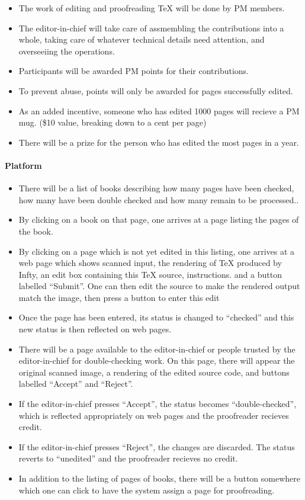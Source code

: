 \begin{itemize}
\begin{itemize}
\item
  The work of editing and proofreading TeX will be done by PM members.
\item
  The editor-in-chief will take care of assmembling the contributions
  into a whole, taking care of whatever technical details need
  attention, and overseeiing the operations.
\item
  Participants will be awarded PM points for their contributions.
\item
  To prevent abuse, points will only be awarded for pages successfully
  edited.
\item
  As an added incentive, someone who has edited 1000 pages will recieve
  a PM mug. (\$10 value, breaking down to a cent per page)
\item
  There will be a prize for the person who has edited the most pages in
  a year.
\end{itemize}

\paragraph{Platform}

\begin{itemize}
\item
  There will be a list of books describing how many pages have been
  checked, how many have been double checked and how many remain to be
  processed..
\item
  By clicking on a book on that page, one arrives at a page listing the
  pages of the book.
\item
  By clicking on a page which is not yet edited in this listing, one
  arrives at a web page which shows scanned input, the rendering of TeX
  produced by Infty, an edit box containing this TeX source,
  instructions. and a button labelled ``Submit''. One can then edit the
  source to make the rendered output match the image, then press a
  button to enter this edit
\item
  Once the page has been entered, its status is changed to ``checked''
  and this new status is then reflected on web pages.
\item
  There will be a page available to the editor-in-chief or people
  trusted by the editor-in-chief for double-checking work. On this page,
  there will appear the original scanned image, a rendering of the
  edited source code, and buttons labelled ``Accept'' and ``Reject''.
\item
  If the editor-in-chief presses ``Accept'', the status becomes
  ``double-checked'', which is reflected appropriately on web pages and
  the proofreader recieves credit.
\item
  If the editor-in-chief presses ``Reject'', the changes are discarded.
  The status reverts to ``unedited'' and the proofreader recieves no
  credit.
\item
  In addition to the listing of pages of books, there will be a button
  somewhere which one can click to have the system assign a page for
  proofreading.
\end{itemize}


\end{itemize}
